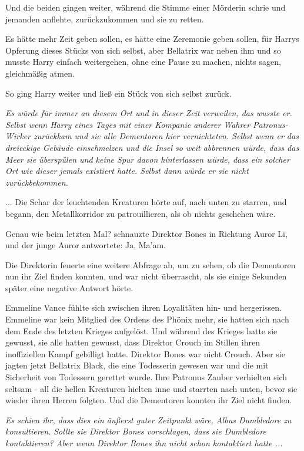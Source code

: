 Und die beiden gingen weiter, während die Stimme einer Mörderin schrie und
jemanden anflehte, zurückzukommen und sie zu retten.

Es hätte mehr Zeit geben sollen, es hätte eine Zeremonie geben sollen, für
Harrys Opferung dieses Stücks von sich selbst, aber Bellatrix war neben ihm und
so musste Harry einfach weitergehen, ohne eine Pause zu machen, nichts sagen,
gleichmäßig atmen.

So ging Harry weiter und ließ ein Stück von sich selbst zurück.

\emph{Es würde für immer an diesem Ort
und in dieser Zeit verweilen, das wusste er. Selbst wenn Harry eines Tages mit
einer Kompanie anderer Wahrer Patronus-Wirker zurückkam und sie alle Dementoren
hier vernichteten. Selbst wenn er das dreieckige Gebäude einschmelzen und die
Insel so weit abbrennen würde, dass das Meer sie überspülen und keine Spur davon
hinterlassen würde, dass ein solcher Ort wie dieser jemals existiert hatte.
Selbst dann würde er sie nicht zurückbekommen.}

... Die Schar der leuchtenden Kreaturen hörte auf, nach unten zu starren, und
begann, den Metallkorridor zu patrouillieren, als ob nichts geschehen wäre.

\glqq{}Genau wie beim letzten Mal?\grqq{} schnauzte Direktor Bones in Richtung
Auror Li, und der junge Auror antwortete: \glqq{}Ja, Ma'am.\grqq{}

Die Direktorin feuerte eine weitere Abfrage ab, um zu sehen, ob die Dementoren
nun ihr Ziel finden konnten, und war nicht überrascht, als sie einige Sekunden
später eine negative Antwort hörte.

Emmeline Vance fühlte sich zwischen ihren Loyalitäten hin- und hergerissen.
Emmeline war kein Mitglied des Ordens des Phönix mehr, sie hatten sich nach dem
Ende des letzten Krieges aufgelöst. Und während des Krieges hatte sie gewusst,
sie alle hatten gewusst, dass Direktor Crouch im Stillen ihren inoffiziellen
Kampf gebilligt hatte. Direktor Bones war nicht Crouch. Aber sie jagten jetzt
Bellatrix Black, die eine Todesserin gewesen war und die mit Sicherheit von
Todessern gerettet wurde. Ihre Patronus Zauber verhielten sich seltsam - all die
hellen Kreaturen hielten inne und starrten nach unten, bevor sie wieder ihren
Herren folgten. Und die Dementoren konnten ihr Ziel nicht finden.

\emph{Es schien ihr, dass dies ein äußerst guter Zeitpunkt wäre, Albus
Dumbledore zu konsultieren.} \emph{Sollte sie Direktor Bones vorschlagen, dass
sie Dumbledore kontaktieren? Aber wenn Direktor Bones ihn nicht schon
kontaktiert hatte ...}

